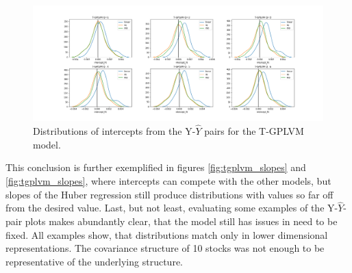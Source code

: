 \begin{figure}[b]
	\centering
	\includegraphics[width=7in]{img/07_3/intercept_fit_time_elbo.png}
	\caption[T-GPLVM intercept distributions]{Distributions of intercepts from the Y-$\hat{Y}$ pairs for the T-GPLVM model.}
	\label{fig:tgplvm_intercepts}
\end{figure}
This conclusion is further exemplified in figures \ref{fig:tgplvm_slopes} and \ref{fig:tgplvm_slopes}, where intercepts can compete with the other models, but slopes of the Huber regression still produce distributions with values so far off from the desired value. Last, but not least, evaluating some examples of the Y-$\hat{Y}$-pair plots makes abundantly clear, that the model still has issues in need to be fixed. All examples show, that distributions match only in lower dimensional representations. The covariance structure of 10 stocks was not enough to be representative of the underlying structure. 
